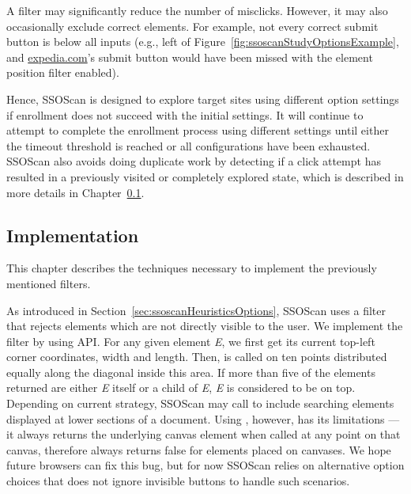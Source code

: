 A filter may significantly reduce the number of mis\-clicks.  However, it may also occasionally exclude correct elements.  For example, not every correct submit button is below all inputs (e.g., left of Figure~\ref{fig:ssoscanStudyOptionsExample}, and \url{expedia.com}'s submit button would have been missed with the element position filter enabled).  

Hence, SSOScan is designed to explore target sites using different option settings if enrollment does not succeed with the initial settings.  It will continue to attempt to complete the enrollment process using different settings until either the timeout threshold is reached or all configurations have been exhausted.  SSOScan also avoids doing duplicate work by detecting if a click attempt has resulted in a previously visited or completely explored state, which is described in more details in Chapter~\ref{sec:ssoscanHeuristicsImpl}.

\subsection{Implementation}
\label{sec:ssoscanHeuristicsImpl}

This chapter describes the techniques necessary to implement the previously mentioned filters.  

 As introduced in Section~\ref{sec:ssoscanHeuristicsOptions}, SSOScan uses a filter that rejects elements which are not directly visible to the user.  We implement the filter by using  API.  For any given element \emph{E}, we first get its current top-left corner coordinates, width and length.  Then,  is called on ten points distributed equally along the diagonal inside this area.  If more than five of the elements returned are either \emph{E} itself or a child of \emph{E}, \emph{E} is considered to be on top.  Depending on current strategy, SSOScan may call  to include searching elements displayed at lower sections of a document.  Using , however, has its limitations --- it always returns the underlying canvas element when called at any point on that canvas, therefore  always returns false for elements placed on canvases.  We hope future browsers can fix this bug, but for now SSOScan relies on alternative option choices that does not ignore invisible buttons to handle such scenarios.

